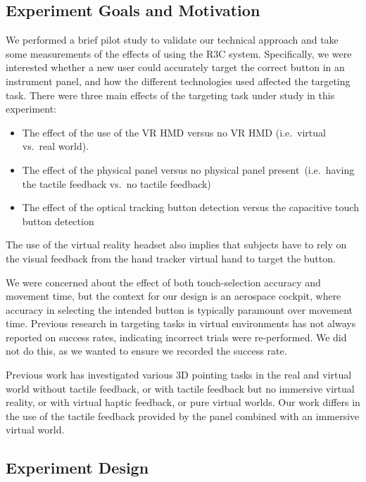 \subsection{Experiment Goals and Motivation}
We performed a brief pilot study to validate our technical approach and take some measurements of the effects of using the R3C system.
Specifically, we were interested whether a new user could accurately target the correct button in an instrument panel, and how the different technologies used affected the targeting task.
There were three main effects of the targeting task under study in this experiment:
\begin{itemize}
    \item The effect of the use of the VR HMD versus no VR HMD (i.e.\ virtual vs.\ real world).
    \item The effect of the physical panel versus no physical panel present\ (i.e.\ having the tactile feedback vs.\ no tactile feedback)
    \item The effect of the optical tracking button detection versus the capacitive touch button detection
\end{itemize}
The use of the virtual reality headset also implies that subjects have to rely on the visual feedback from the hand tracker virtual hand to target the button.

We were concerned about the effect of both touch-selection accuracy and movement time, but the context for our design is an aerospace cockpit, where accuracy in selecting the intended button is typically paramount over movement time.
Previous research in targeting tasks in virtual environments has not always reported on success rates, indicating incorrect trials were re-performed.
We did not do this, as we wanted to ensure we recorded the success rate.

Previous work has investigated various 3D pointing tasks in the real and virtual world without tactile feedback\cite{liu_comparing_2009}, or with tactile feedback but no immersive virtual reality\cite{teather_evaluating_2010}, or with virtual haptic feedback\cite{chun_evaluating_2004}, or pure virtual worlds\cite{bruder_touch_2013,grossman_pointing_2004}.
Our work differs in the use of the tactile feedback provided by the panel combined with an immersive virtual world.

\subsection{Experiment Design}

